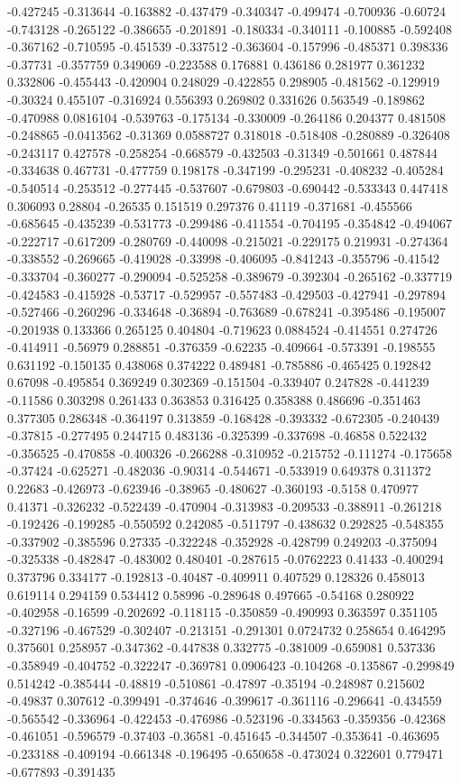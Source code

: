 -0.427245 -0.313644 -0.163882 -0.437479 -0.340347 -0.499474 -0.700936 -0.60724 -0.743128 -0.265122 -0.386655 -0.201891 -0.180334 -0.340111 -0.100885 -0.592408 -0.367162 -0.710595 -0.451539 -0.337512 -0.363604 -0.157996 -0.485371 0.398336 -0.37731 -0.357759 0.349069 -0.223588 0.176881 0.436186 0.281977 0.361232 0.332806 -0.455443 -0.420904 0.248029 -0.422855 0.298905 -0.481562 -0.129919 -0.30324 0.455107 -0.316924 0.556393 0.269802 0.331626 0.563549 -0.189862 -0.470988 0.0816104 -0.539763 -0.175134 -0.330009 -0.264186 0.204377 0.481508 -0.248865 -0.0413562 -0.31369 0.0588727 0.318018 -0.518408 -0.280889 -0.326408 -0.243117 0.427578 -0.258254 -0.668579 -0.432503 -0.31349 -0.501661 0.487844 -0.334638 0.467731 -0.477759 0.198178 -0.347199 -0.295231 -0.408232 -0.405284 -0.540514 -0.253512 -0.277445 -0.537607 -0.679803 -0.690442 -0.533343 0.447418 0.306093 0.28804 -0.26535 0.151519 0.297376 0.41119 -0.371681 -0.455566 -0.685645 -0.435239 -0.531773 -0.299486 -0.411554 -0.704195 -0.354842 -0.494067 -0.222717 -0.617209 -0.280769 -0.440098 -0.215021 -0.229175 0.219931 -0.274364 -0.338552 -0.269665 -0.419028 -0.33998 -0.406095 -0.841243 -0.355796 -0.41542 -0.333704 -0.360277 -0.290094 -0.525258 -0.389679 -0.392304 -0.265162 -0.337719 -0.424583 -0.415928 -0.53717 -0.529957 -0.557483 -0.429503 -0.427941 -0.297894 -0.527466 -0.260296 -0.334648 -0.36894 -0.763689 -0.678241 -0.395486 -0.195007 -0.201938 0.133366 0.265125 0.404804 -0.719623 0.0884524 -0.414551 0.274726 -0.414911 -0.56979 0.288851 -0.376359 -0.62235 -0.409664 -0.573391 -0.198555 0.631192 -0.150135 0.438068 0.374222 0.489481 -0.785886 -0.465425 0.192842 0.67098 -0.495854 0.369249 0.302369 -0.151504 -0.339407 0.247828 -0.441239 -0.11586 0.303298 0.261433 0.363853 0.316425 0.358388 0.486696 -0.351463 0.377305 0.286348 -0.364197 0.313859 -0.168428 -0.393332 -0.672305 -0.240439 -0.37815 -0.277495 0.244715 0.483136 -0.325399 -0.337698 -0.46858 0.522432 -0.356525 -0.470858 -0.400326 -0.266288 -0.310952 -0.215752 -0.111274 -0.175658 -0.37424 -0.625271 -0.482036 -0.90314 -0.544671 -0.533919 0.649378 0.311372 0.22683 -0.426973 -0.623946 -0.38965 -0.480627 -0.360193 -0.5158 0.470977 0.41371 -0.326232 -0.522439 -0.470904 -0.313983 -0.209533 -0.388911 -0.261218 -0.192426 -0.199285 -0.550592 0.242085 -0.511797 -0.438632 0.292825 -0.548355 -0.337902 -0.385596 0.27335 -0.322248 -0.352928 -0.428799 0.249203 -0.375094 -0.325338 -0.482847 -0.483002 0.480401 -0.287615 -0.0762223 0.41433 -0.400294 0.373796 0.334177 -0.192813 -0.40487 -0.409911 0.407529 0.128326 0.458013 0.619114 0.294159 0.534412 0.58996 -0.289648 0.497665 -0.54168 0.280922 -0.402958 -0.16599 -0.202692 -0.118115 -0.350859 -0.490993 0.363597 0.351105 -0.327196 -0.467529 -0.302407 -0.213151 -0.291301 0.0724732 0.258654 0.464295 0.375601 0.258957 -0.347362 -0.447838 0.332775 -0.381009 -0.659081 0.537336 -0.358949 -0.404752 -0.322247 -0.369781 0.0906423 -0.104268 -0.135867 -0.299849 0.514242 -0.385444 -0.48819 -0.510861 -0.47897 -0.35194 -0.248987 0.215602 -0.49837 0.307612 -0.399491 -0.374646 -0.399617 -0.361116 -0.296641 -0.434559 -0.565542 -0.336964 -0.422453 -0.476986 -0.523196 -0.334563 -0.359356 -0.42368 -0.461051 -0.596579 -0.37403 -0.36581 -0.451645 -0.344507 -0.353641 -0.463695 -0.233188 -0.409194 -0.661348 -0.196495 -0.650658 -0.473024 0.322601 0.779471 -0.677893 -0.391435 